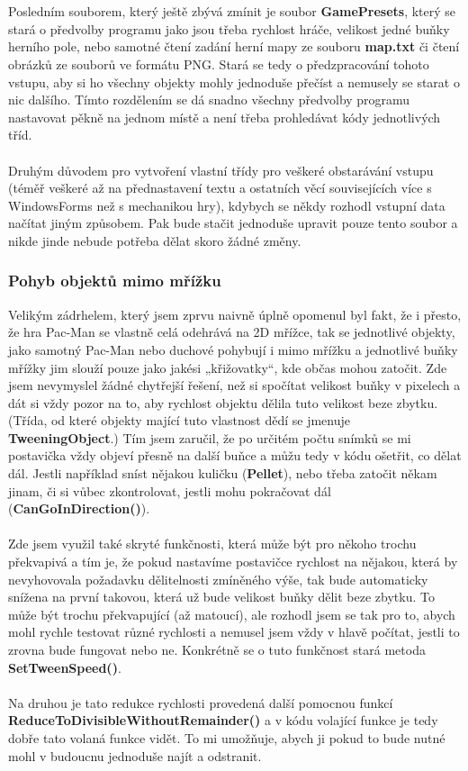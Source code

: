 \documentclass[a4]{article}
\begin{document}
\\\\
Posledním souborem, který ještě zbývá zmínit je soubor \textbf{GamePresets}, který se stará o předvolby programu jako jsou třeba rychlost hráče, velikost jedné buňky herního pole, nebo samotné čtení zadání herní mapy ze souboru \textbf{map.txt} či čtení obrázků ze souborů ve formátu PNG. Stará se tedy o předzpracování tohoto vstupu, aby si ho všechny objekty mohly jednoduše přečíst a nemusely se starat o nic dalšího. Tímto rozdělením se dá snadno všechny předvolby programu nastavovat pěkně na jednom místě a není třeba prohledávat kódy jednotlivých tříd.
\\\\
Druhým důvodem pro vytvoření vlastní třídy pro veškeré obstarávání vstupu (téměř veškeré až na přednastavení textu a ostatních věcí souvisejících více s WindowsForms než s mechanikou hry), kdybych se někdy rozhodl vstupní data načítat jiným způsobem. Pak bude stačit jednoduše upravit pouze tento soubor a nikde jinde nebude potřeba dělat skoro žádné změny.
\subsubsection{Pohyb objektů mimo mřížku}
Velikým zádrhelem, který jsem zprvu naivně úplně opomenul byl fakt, že i přesto, že hra Pac-Man se vlastně celá odehrává na 2D mřížce, tak se jednotlivé objekty, jako samotný Pac-Man nebo duchové pohybují i mimo mřížku a jednotlivé buňky mřížky jim slouží pouze jako jakési „křižovatky“, kde občas mohou zatočit. Zde jsem nevymyslel žádné chytřejší řešení, než si spočítat velikost buňky v pixelech a dát si vždy pozor na to, aby rychlost objektu dělila tuto velikost beze zbytku. (Třída, od které objekty mající tuto vlastnost dědí se jmenuje \textbf{TweeningObject}.) Tím jsem zaručil, že po určitém počtu snímků se mi postavička vždy objeví přesně na další buňce a můžu tedy v kódu ošetřit, co dělat dál. Jestli například sníst nějakou kuličku (\textbf{Pellet}), nebo třeba zatočit někam jinam, či si vůbec zkontrolovat, jestli mohu pokračovat dál (\textbf{CanGoInDirection()}).
\\\\
Zde jsem využil také skryté funkčnosti, která může být pro někoho trochu překvapivá a tím je, že pokud nastavíme postavičce rychlost na nějakou, která by nevyhovovala požadavku dělitelnosti zmíněného výše, tak bude automaticky snížena na první takovou, která už bude velikost buňky dělit beze zbytku. To může být trochu překvapující (až matoucí), ale rozhodl jsem se tak pro to, abych mohl rychle testovat různé rychlosti a nemusel jsem vždy v hlavě počítat, jestli to zrovna bude fungovat nebo ne. Konkrétně se o tuto funkčnost stará metoda \textbf{SetTweenSpeed()}. 
\\\\
Na druhou je tato redukce rychlosti provedená další pomocnou funkcí \textbf{ReduceToDivisibleWithoutRemainder()} a v kódu volající funkce je tedy dobře tato volaná funkce vidět. To mi umožňuje, abych ji pokud to bude nutné mohl v budoucnu jednoduše najít a odstranit.
\end{document}
